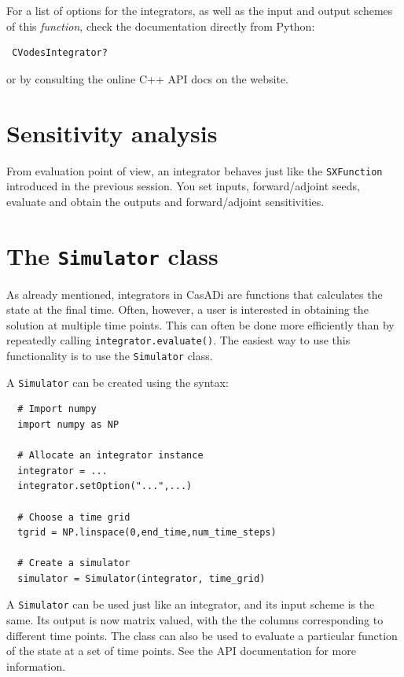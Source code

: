 \documentclass[a4paper,12pt]{book}
\begin{document}
{For a list of options for the integrators, as well as the input and output schemes of this \emph{function}, check the documentation directly from Python:
\begin{verbatim}
 CVodesIntegrator?
\end{verbatim}
or by consulting the online C++ API docs on the website.

\section{Sensitivity analysis}
From evaluation point of view, an integrator behaves just like the \texttt{SXFunction} introduced in the previous session. You set inputs, forward/adjoint seeds, evaluate and obtain the outputs and forward/adjoint sensitivities.

\section{The \texttt{Simulator} class}
As already mentioned, integrators in CasADi are functions that calculates the state at the final time. Often, however, a user is interested in obtaining the solution at multiple time points. This can often be done more efficiently than by repeatedly calling \texttt{integrator.evaluate()}. The easiest way to use this functionality is to use the \texttt{Simulator} class.

A \texttt{Simulator} can be created using the syntax:
\begin{verbatim}
  # Import numpy
  import numpy as NP

  # Allocate an integrator instance
  integrator = ...
  integrator.setOption("...",...)

  # Choose a time grid
  tgrid = NP.linspace(0,end_time,num_time_steps)

  # Create a simulator
  simulator = Simulator(integrator, time_grid)
\end{verbatim}

A \texttt{Simulator} can be used just like an integrator, and its input scheme is the same. Its output is now matrix valued, with the the columns corresponding to different time points. The class can also be used to evaluate a particular function of the state at a set of time points. See the API documentation for more information.

}
\end{document}
